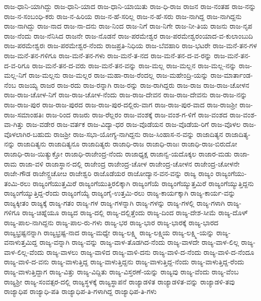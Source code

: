 {ರಾಜ-ಧಾನಿ-ಯಾಗಿದ್ದು
ರಾಜ-ಧಾನಿ-ಯಾದ
ರಾಜ-ಧಾನಿ-ಯಾಯಿತು
ರಾಜ-ಧಿ-ರಾಜ
ರಾಜನ
ರಾಜ-ನಂತಹ
ರಾಜ-ನನ್ನು
ರಾಜ-ನ-ಸಂಬಂಧಿ-ಕರು
ರಾಜ-ನ-ಹಿರಿಯ
ರಾಜ-ನ-ಹೆ-ಸರಿಲ್ಲ
ರಾಜ-ನ-ಹೆ-ಸರು
ರಾಜ-ನಾಗಿದ್ದ
ರಾಜ-ನಾಗಿದ್ದನು
ರಾಜ-ನಾಗಿದ್ದು
ರಾಜ-ನಾದ
ರಾಜ-ನಾ-ದನು
ರಾಜ-ನಿಂದ
ರಾಜ-ನಿಗೆ
ರಾಜ-ನಿಗೇ
ರಾಜ-ನೀ-ತಿಯ
ರಾಜನು
ರಾಜ-ನೃಪ
ರಾಜ-ನೆಂದು
ರಾಜ-ನೆನಿಸಿದ
ರಾಜನೇ
ರಾಜ-ನೊಡನೆ
ರಾಜ-ಪರಮೇಶ್ವರ
ರಾಜ-ಪರಮೇಶ್ವರಂಯಾದ-ವ-ಕುಲಾಂಬುದಿ
ರಾಜ-ಪರಮೇಶ್ವರಃ
ರಾಜ-ಪರಮೇಶ್ವರ-ನೆಂದು
ರಾಜಪ್ರತಿ-ನಿಧಿಯ
ರಾಜ-ಬೆವಹಾರಿ
ರಾಜ-ಭಟರೇ
ರಾಜ-ಮನೆ-ತನ-ಗಳ
ರಾಜ-ಮನೆ-ತನ-ಗಳಿಗೂ
ರಾಜ-ಮನೆ-ತನ-ಗಳು
ರಾಜ-ಮನೆ-ತ-ನದ
ರಾಜ-ಮನೆ-ತನ-ದ-ವ-ರನ್ನು
ರಾಜ-ಮನೆ-ತನ-ದ-ವ-ರಿಗೂ
ರಾಜ-ಮನೆ-ತನ-ದ-ವರು
ರಾಜ-ಮನೆ-ತನ-ವನ್ನು
ರಾಜ-ಮಲ್ಲ
ರಾಜ-ಮಲ್ಲನ
ರಾಜ-ಮಲ್ಲ-ನನ್ನು
ರಾಜ-ಮಲ್ಲ-ನಿಗೆ
ರಾಜ-ಮಲ್ಲನು
ರಾಜ-ಮಲ್ಲರ
ರಾಜ-ಮಹಾ-ರಾಜ-ರೆಂದಲ್ಲ
ರಾಜ-ಮಹೇಂದ್ರಿ-ಯನ್ನು
ರಾಜ-ಮಾರ್ತಾಂಡ-ನೆಂಬ
ರಾಜಯ್ಯ
ರಾಜರ
ರಾಜ-ರದು
ರಾಜ-ರನ್ನಾಗಿ
ರಾಜ-ರನ್ನು
ರಾಜ-ರಾಗಿದ್ದರು
ರಾಜ-ರಾಜ
ರಾಜ-ರಾಜ-ಚೋಳನ
ರಾಜ-ರಾಜ-ಚೋಳ-ನಿಗೆ
ರಾಜ-ರಾಜ-ಚೋಳ-ನೆಂದು
ರಾಜ-ರಾಜ-ದೇವನ
ರಾಜ-ರಾಜ-ದೇವನು
ರಾಜ-ರಾಜ-ನನ್ನು
ರಾಜ-ರಾಜ-ಪುರ
ರಾಜ-ರಾಜ-ಪುರದ
ರಾಜ-ರಾಜ-ಪುರ-ದಲ್ಲಿರು-ವಾಗ
ರಾಜ-ರಾಜ-ಪುರ-ವಾದ
ರಾಜ-ರಾಜಶ್ರೀ
ರಾಜ-ರಾಜ-ಸಮಾಂಹತಿಃ
ರಾಜ-ರಿಂದ
ರಾಜರು
ರಾಜ-ರೆಲ್ಲರಂ
ರಾಜ-ವಂಶಕ್ಕೆ
ರಾಜ-ವಂಶ-ಗ-ಳಿಗೆ
ರಾಜ-ವಂಶದ
ರಾಜ-ವಂಶ-ವಾ-ಗಿತ್ತು
ರಾಜ-ವಡೇರ
ರಾಜ-ವರ್ತಕ
ರಾಜ-ವಿದ್ಯಾ-ಧರ
ರಾಜ-ವೊಡೆಯನ
ರಾಜ-ವೊಡೆಯ-ರಿಗೆ
ರಾಜ-ವೊಳಲ
ರಾಜ-ವೊಳಲಾಗಿರ-ಬಹುದು
ರಾಜಶ್ರೀ
ರಾಜ-ಸಭಾ-ಯೋಗ್ಯ-ನಾಗಿದ್ದನು
ರಾಜ-ಸಿಂಹಾಸ-ನ-ವನ್ನು
ರಾಜಾದಿತ್ಯನ
ರಾಜಾದಿತ್ಯ-ನನ್ನು
ರಾಜಾದಿತ್ಯನು
ರಾಜಾದಿತ್ಯನೂ
ರಾಜಾದಿತ್ಯರು
ರಾಜಾಧಿ-ರಾಜ
ರಾಜಾಧಿ-ರಾಜಃ
ರಾಜಾಧಿ-ರಾಜ-ಬಿರುದೋ
ರಾಜಾಧಿ-ರಾಜ-ಯಿತ್ಯುಕ್ತೋ
ರಾಜಾಧಿ-ರಾಜೇಂದ್ರ-ನೆಂದು
ರಾಜಾಧ್ಯಕ್ಷ
ರಾಜಾನ್ವ-ಯದೊಕ್ಕಲ
ರಾಜಾರ-ಮಡು
ರಾಜಾ-ರಾಮ
ರಾಜಾ-ವಳಿ
ರಾಜಾಸ್ಥಾನ-ದಲ್ಲಿ
ರಾಜೇಂದ್ರ
ರಾಜೇಂದ್ರ-ಚೋಳ
ರಾಜೇಂದ್ರ-ಚೋಳನ
ರಾಜೇಂದ್ರ-ಚೋಳನೇ
ರಾಜೇ-ಗೌಡ
ರಾಜೇನ್ದ್ರಚೋೞ
ರಾಜೇಶ್ವರಿ
ರಾಜೊಡೆಯರ
ರಾಜೋದ್ಯಾನ-ವನ-ವನ್ನು
ರಾಜ್ಯ
ರಾಜ್ಯಂ
ರಾಜ್ಯಂಗೆಯು-ತಂಮಿ-ರಲು
ರಾಜ್ಯಂಗೆಯುತ್ತಮಿರೆ
ರಾಜ್ಯಂಗೆಯುತ್ತಿರಲಿಕ್ಕಾಗಿ
ರಾಜ್ಯಂಗೆಯೆ
ರಾಜ್ಯಂಗೆಯ್ಯುತ್ತಮಿರೆ
ರಾಜ್ಯಂಗೆಯ್ಯುತ್ತಿದ್ದನು
ರಾಜ್ಯಂಗೆಯ್ಯುತ್ತಿದ್ದ-ರೆಂದು
ರಾಜ್ಯಂಗೆಯ್ಯೆ
ರಾಜ್ಯಂಗೈ-ಉತ್ತಮಿ-ರಲು
ರಾಜ್ಯ-ಕಾರ್ಯಕ್ಕಾಗಿ
ರಾಜ್ಯ-ಕಾರ್ಯ-ವನ್ನು
ರಾಜ್ಯಕ್ಕೀತಂ
ರಾಜ್ಯಕ್ಕೆ
ರಾಜ್ಯ-ಗತಂ
ರಾಜ್ಯ-ಗಳ
ರಾಜ್ಯ-ಗಳನ್ನಾಗಿ
ರಾಜ್ಯ-ಗಳನ್ನು
ರಾಜ್ಯ-ಗಳಲ್ಲಿ
ರಾಜ್ಯ-ಗಳಾಗಿ
ರಾಜ್ಯ-ಗಳಿಗೂ
ರಾಜ್ಯ-ಚಿಹ್ನೆಯೂ
ರಾಜ್ಯದ
ರಾಜ್ಯ-ದಲ್ಲಿ
ರಾಜ್ಯ-ದಲ್ಲಿತ್ತೆಂದು
ರಾಜ್ಯ-ದಿಂದ
ರಾಜ್ಯ-ದೇಶ-ಸೀಮೆ
ರಾಜ್ಯ-ದೊಳ್
ರಾಜ್ಯ-ಪಾಲ-ನಾಗಿದ್ದನು
ರಾಜ್ಯ-ಪಾಲ-ರು-ಗಳು
ರಾಜ್ಯ-ಭರ
ರಾಜ್ಯ-ಭಾರ
ರಾಜ್ಯ-ಭಾರಕ್ಕೆ
ರಾಜ್ಯ-ಭಾರದ
ರಾಜ್ಯಭ್ರಷ್ಟನನ್ನಾಗಿ
ರಾಜ್ಯಭ್ರಷ್ಟ-ನಾದ
ರಾಜ್ಯ-ಮಧ್ಯೇ
ರಾಜ್ಯ-ಲಕ್ಷ್ಮಿ
ರಾಜ್ಯ-ಲಕ್ಷ್ಮಿಯ
ರಾಜ್ಯ-ಲಕ್ಷ್ಮಿ-ಯನ್ನು
ರಾಜ್ಯ-ವನಾಳುತ್ತಮಿದ್ದ
ರಾಜ್ಯ-ವನ್ನಾಗಿ
ರಾಜ್ಯ-ವನ್ನು
ರಾಜ್ಯ-ವಾಳ-ತೊಡಗಿದ-ನೆಂದು
ರಾಜ್ಯ-ವಾಳದೇ
ರಾಜ್ಯ-ವಾಳ-ಲಿಲ್ಲ
ರಾಜ್ಯ-ವಾಳ-ಲಿಲ್ಲ-ವೆಂದು
ರಾಜ್ಯ-ವಾಳಲು
ರಾಜ್ಯ-ವಾಳಿದ
ರಾಜ್ಯ-ವಾಳಿ-ದನು
ರಾಜ್ಯ-ವಾಳಿ-ದ-ನೆಂದು
ರಾಜ್ಯ-ವಾಳಿ-ದ-ನೆಂದೂ
ರಾಜ್ಯ-ವಾಳಿ-ದ-ವನು
ರಾಜ್ಯ-ವಾಳುತ್ತಿದ್ದ
ರಾಜ್ಯ-ವಾಳುತ್ತಿದ್ದನು
ರಾಜ್ಯ-ವಾಳುತ್ತಿದ್ದ-ನೆಂದು
ರಾಜ್ಯ-ವಾಳುತ್ತಿದ್ದ-ರೆಂದು
ರಾಜ್ಯ-ವಾಳುತ್ತಿದ್ದಾಗ
ರಾಜ್ಯ-ವಿತ್ತು
ರಾಜ್ಯ-ವಿದ್ದಿತು
ರಾಜ್ಯ-ವಿಸ್ತರಣೆ-ಯನ್ನು
ರಾಜ್ಯವು
ರಾಜ್ಯ-ವೆಂದು
ರಾಜ್ಯ-ವೆಂಬ
ರಾಜ್ಯಶ್ರೀ
ರಾಜ್ಯ-ಸಂವತ್ಸರ-ದಲ್ಲಿ
ರಾಜ್ಯಸ್ಥಳಕ್ಕೆ
ರಾಜ್ಯಸ್ಥಾಪನೆ
ರಾಜ್ಯಾಡಳಿತ
ರಾಜ್ಯಾಡಳಿತ-ವನ್ನು
ರಾಜ್ಯಾಡಳಿ-ತವು
ರಾಜ್ಯಾಧಿಪ
ರಾಜ್ಯಾಧಿ-ಪತಿ
ರಾಜ್ಯಾಧಿಪ-ತಿ-ಗಳಾಗಿದ್ದ
ರಾಜ್ಯಾಧಿಪ-ತಿ-ಗಳು
}
